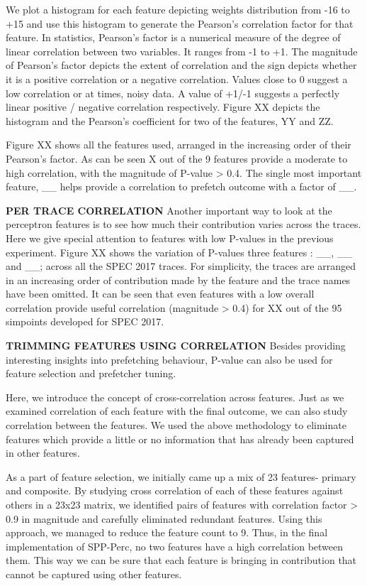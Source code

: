 We plot a histogram for each feature depicting weights distribution
from -16 to +15 and use this histogram to generate the Pearson's
correlation factor for that feature.  In statistics, Pearson's factor
is a numerical measure of the degree of linear correlation between two
variables.  It ranges from -1 to +1.  The magnitude of Pearson's
factor depicts the extent of correlation and the sign depicts whether
it is a positive correlation or a negative correlation.  Values close
to 0 suggest a low correlation or at times, noisy data.  A value of
+1/-1 suggests a perfectly linear positive / negative correlation
respectively.  Figure XX depicts the histogram and the Pearson's
coefficient for two of the features, YY and ZZ.

Figure XX shows all the features used, arranged in the increasing
order of their Pearson's factor.  As can be seen X out of the 9
features provide a moderate to high correlation, with the magnitude of
P-value > 0.4.  The single most important feature, \_\_ helps provide
a correlation to prefetch outcome with a factor of \_\_.

\textbf{PER TRACE CORRELATION} \newline Another important way to look
at the perceptron features is to see how much their contribution
varies across the traces.  Here we give special attention to features
with low P-values in the previous experiment.  Figure XX shows the
variation of P-values three features : \_\_, \_\_ and \_\_; across all
the SPEC 2017 traces.  For simplicity, the traces are arranged in an
increasing order of contribution made by the feature and the trace
names have been omitted.  It can be seen that even features with a low
overall correlation provide useful correlation (magnitude > 0.4) for
XX out of the 95 simpoints developed for SPEC 2017.  

\textbf{TRIMMING FEATURES USING CORRELATION} \newline Besides
providing interesting insights into prefetching behaviour, P-value can
also be used for feature selection and prefetcher tuning.

Here, we introduce the concept of cross-correlation across features.
Just as we examined correlation of each feature with the final
outcome, we can also study correlation between the features.  We used
the above methodology to eliminate features which provide a little or
no information that has already been captured in other features.

As a part of feature selection, we initially came up a mix of 23
features- primary and composite.  By studying cross correlation of
each of these features against others in a 23x23 matrix, we identified
pairs of features with correlation factor > 0.9 in magnitude and
carefully eliminated redundant features.  Using this approach, we
managed to reduce the feature count to 9.  Thus, in the final
implementation of SPP-Perc, no two features have a high correlation
between them.  This way we can be sure that each feature is bringing
in contribution that cannot be captured using other features.

